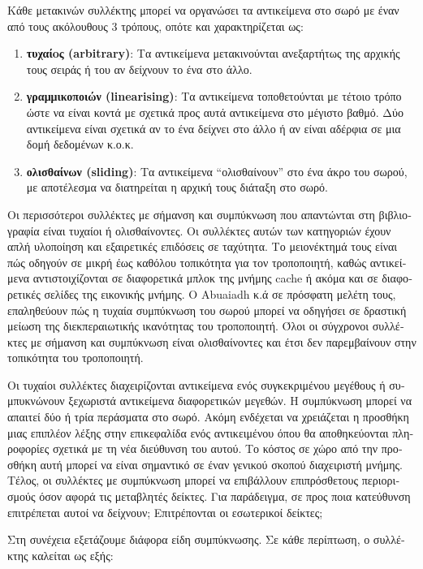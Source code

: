 \begin{greek}
Κάθε μετακινών συλλέκτης μπορεί να οργανώσει τα αντικείμενα στο σωρό με έναν από τους 
ακόλουθους 3 τρόπους, οπότε και χαρακτηρίζεται ως:
\begin{enumerate}
\item \textbf{τυχαίoς (arbitrary)}: Τα αντικείμενα μετακινούνται ανεξαρτήτως της αρχικής 
      τους σειράς ή του αν δείχνουν το ένα στο άλλο. 
\item \textbf{γραμμικοποιών (linearising)}: Τα αντικείμενα τοποθετούνται με τέτοιο 
      τρόπο ώστε να είναι κοντά με σχετικά προς αυτά αντικείμενα στο μέγιστο βαθμό. Δύο 
      αντικείμενα είναι σχετικά αν το ένα δείχνει στο άλλο ή αν είναι αδέρφια σε μια 
      δομή δεδομένων κ.ο.κ.
\item \textbf{ολισθαίνων (sliding)}: Τα αντικείμενα ``ολισθαίνουν'' στο ένα άκρο του 
      σωρού, με αποτέλεσμα να διατηρείται η αρχική τους διάταξη στο σωρό. 
\end{enumerate}

Οι περισσότεροι συλλέκτες με σήμανση και συμπύκνωση που απαντώνται στη βιβλιογραφία είναι 
τυχαίοι ή ολισθαίνοντες. Οι συλλέκτες αυτών των κατηγοριών έχουν απλή υλοποίηση και 
εξαιρετικές επιδόσεις σε ταχύτητα. Το μειονέκτημά τους είναι πώς οδηγούν σε μικρή έως 
καθόλου τοπικότητα για τον τροποποιητή, καθώς αντικείμενα αντιστοιχίζονται σε διαφορετικά 
μπλοκ της μνήμης cache ή ακόμα και σε διαφορετικές σελίδες της εικονικής μνήμης. Ο 
Abuaiadh κ.ά  σε πρόσφατη μελέτη τους, \cite{DBLP:conf/oopsla/AbuaiadhOPS04} επαληθεύουν 
πώς η τυχαία συμπύκνωση του σωρού μπορεί να οδηγήσει σε δραστική μείωση της διεκπεραιωτικής 
ικανότητας του τροποποιητή. Όλοι οι σύγχρονοι συλλέκτες με σήμανση και συμπύκνωση είναι 
ολισθαίνοντες και έτσι δεν παρεμβαίνουν στην τοπικότητα του τροποποιητή.

Οι τυχαίοι συλλέκτες διαχειρίζονται αντικείμενα ενός συγκεκριμένου μεγέθους ή συμπυκνώνουν 
ξεχωριστά αντικείμενα διαφορετικών μεγεθών. Η συμπύκνωση μπορεί να απαιτεί δύο ή τρία 
περάσματα στο σωρό. Ακόμη ενδέχεται να χρειάζεται η προσθήκη μιας επιπλέον λέξης στην 
επικεφαλίδα ενός αντικειμένου όπου θα αποθηκεύονται πληροφορίες σχετικά με τη νέα διεύθυνση 
του αυτού. Το κόστος σε χώρο από την προσθήκη αυτή μπορεί να είναι σημαντικό σε έναν γενικού 
σκοπού διαχειριστή μνήμης. Τέλος, οι συλλέκτες με συμπύκνωση μπορεί να επιβάλλουν 
επιπρόσθετους περιορισμούς όσον αφορά τις μεταβλητές δείκτες. Για παράδειγμα, σε προς ποια 
κατεύθυνση επιτρέπεται αυτοί να δείχνουν; Επιτρέπονται οι εσωτερικοί δείκτες;

Στη συνέχεια εξετάζουμε διάφορα είδη συμπύκνωσης. Σε κάθε περίπτωση, ο συλλέκτης καλείται 
ως εξής:


\end{greek}
